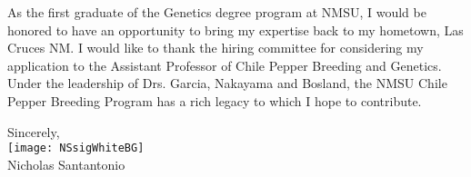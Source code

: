 \documentclass[11pt, letterpaper]{moderncv}
\begin{document}
As the first graduate of the Genetics degree program at NMSU, I would be honored to have an opportunity to bring my expertise back to my hometown, Las Cruces NM. I would like to thank the hiring committee for considering my application to the Assistant Professor of Chile Pepper Breeding and Genetics. Under the leadership of Drs. Garcia, Nakayama and Bosland, the NMSU Chile Pepper Breeding Program has a rich legacy to which I hope to contribute. 

\vspace{3mm}

Sincerely,\\
\texttt{[image: NSsigWhiteBG]}\\
Nicholas Santantonio
\end{document}
